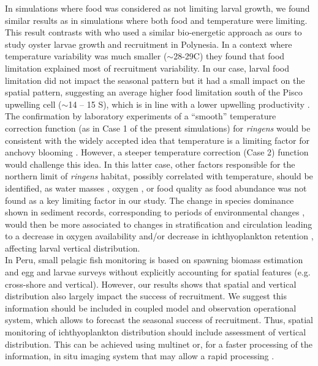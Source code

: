 In simulations where food was considered as not limiting larval growth, we found similar results as in simulations where both food and temperature were limiting. This result contrasts with \cite{ThomDuma2016} who used a similar bio-energetic approach as ours to study oyster larvae growth and recruitment in Polynesia. In a context where temperature variability was much smaller ($\sim$28-29\textdegree C) they found that food limitation explained most of recruitment variability. In our case, larval food limitation did not impact the seasonal pattern but it had a small impact on the spatial pattern, suggesting an average higher food limitation south of the Pisco upwelling cell ($\sim$14 – 15 \textdegree S), which is in line with a lower upwelling productivity \citep{EspiEche2017}.\\

The confirmation by laboratory experiments of a ``smooth” temperature correction function (as in Case 1 of the present simulations) for \textit{\gls{ringens}} would be consistent with the widely accepted idea that temperature is a limiting factor for anchovy blooming \citep{ChavBert2008}. However, a steeper temperature correction (Case 2) function would challenge this idea. In this latter case, other factors responsible for the northern limit of \textit{\gls{ringens}} habitat, possibly correlated with temperature, should be identified, as water masses \citep{BertSegu2004,SwarBert2008}, oxygen \citep{BertChai2011}, or food quality \citep{AyonSwar2008,CaldAyor2020} as food abundance was not found as a key limiting factor in our study. The change in species dominance shown in sediment records, corresponding to periods of environmental changes \citep{SalvField2018,SalvGuti2019}, would then be more associated to changes in stratification and circulation leading to a decrease in oxygen availability and/or decrease in ichthyoplankton retention \citep{BrocEche2013,EspiEche2021}, affecting larval vertical distribution.\\

In Peru, small pelagic fish monitoring is based on spawning biomass estimation and egg and larvae surveys \citep{PaulSori1987,Ayon2000,GutiCast2012} without explicitly accounting for spatial features (e.g. cross-shore and vertical). However, our results shows that spatial and vertical distribution also largely impact the success of recruitment. We suggest this information should be included in coupled model and observation operational system, which allows to forecast the seasonal success of recruitment. Thus, spatial monitoring of ichthyoplankton distribution should include assessment of vertical distribution. This can be achieved using multinet or, for a faster processing of the information, in situ imaging system that may allow a rapid processing \citep{OrenRate2020}.

